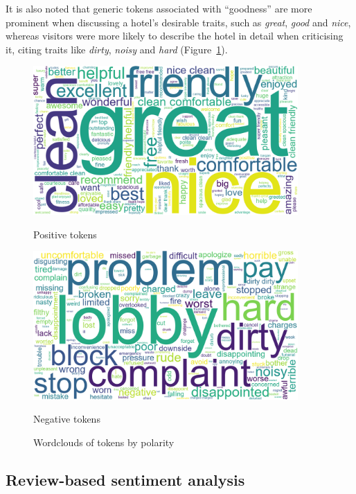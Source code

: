 \documentclass[11pt, a4paper]{pancake-article}
\begin{document}
It is also noted that generic tokens associated with ``goodness'' are more
prominent when discussing a hotel's desirable traits, such as \textit{great},
\textit{good} and \textit{nice}, whereas visitors were more likely to
describe the hotel in detail when criticising it, citing traits like
\textit{dirty}, \textit{noisy} and \textit{hard} (Figure~\ref{fig:wordclouds}).

\begin{figure}[htpb]
  \centering
  \begin{minipage}{0.5\textwidth}
    \centering
    \includegraphics[width=0.9\textwidth]{../results/old/wordcloud_1.png}
    \caption*{Positive tokens}
  \end{minipage}\hfill
  \begin{minipage}{0.5\textwidth}
    \centering
    \includegraphics[width=0.9\textwidth]{../results/old/wordcloud_0.png}
    \caption*{Negative tokens}
  \end{minipage}
  \caption{Wordclouds of tokens by polarity}
  \label{fig:wordclouds}
\end{figure}

\subsection{Review-based sentiment analysis}\label{sec:reviews}
\end{document}

